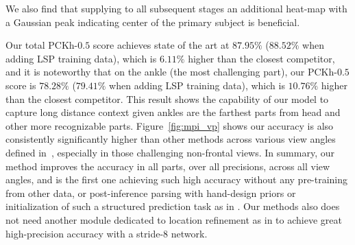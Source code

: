 \documentclass[10pt,twocolumn,letterpaper]{article}
\begin{document}
We also find that supplying to all subsequent stages an additional heat-map with a Gaussian peak indicating center of the primary subject is beneficial.

Our total PCKh-$0.5$ score achieves state of the art at $87.95\%$ ($88.52\%$ when adding LSP training data), which is $6.11\%$ higher than the closest competitor, and it is noteworthy that on the ankle (the most challenging part), our PCKh-$0.5$ score is $78.28\%$ ($79.41\%$ when adding LSP training data), which is $10.76\%$ higher than the closest competitor. This result shows the capability of our model to capture long distance context given ankles are the farthest parts from head and other more recognizable parts. Figure~\ref{fig:mpi_vp} shows our accuracy is also consistently significantly higher than other methods across various view angles defined in~\cite{andriluka14cvpr}, especially in those challenging non-frontal views.
%
In summary, our method improves the accuracy in all parts, over all precisions, across all view angles, and is the first one achieving such high accuracy without any pre-training from other data, or post-inference parsing with hand-design priors or initialization of such a structured prediction task as in \cite{tompson2014joint,pishchulin2015deepcut}. Our methods also does not need another module dedicated to location refinement as in \cite{tompson2015cvpr} to achieve great high-precision accuracy with a stride-8 network.
\end{document}
